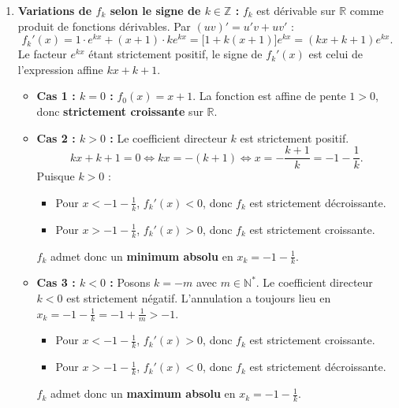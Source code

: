 \documentclass[11pt,a4paper]{article}
\newcommand{\N}{\mathbb{N}}
\newcommand{\Z}{\mathbb{Z}}
\newcommand{\R}{\mathbb{R}}
\begin{document}
\begin{correctionbox}[Exercice 8]
\begin{enumerate}[label=\textbf{\arabic*.}]
    \item \textbf{Variations de $f_k$ selon le signe de $k \in \Z$ :}
    $f_k$ est dérivable sur $\R$ comme produit de fonctions dérivables. Par $(uv)' = u'v + uv'$ :
    \[
    f_k'(x) = 1 \cdot e^{kx} + (x+1) \cdot k e^{kx} = \bigl[1 + k(x+1)\bigr]e^{kx} = (kx + k + 1)e^{kx}.
    \]
    Le facteur $e^{kx}$ étant strictement positif, le signe de $f_k'(x)$ est celui de l'expression affine $kx + k + 1$.
    \begin{itemize}
        \item \textbf{Cas 1 : $k = 0$ :}
        $f_0(x) = x + 1$. La fonction est affine de pente $1 > 0$, donc \textbf{strictement croissante} sur $\R$.
        \item \textbf{Cas 2 : $k > 0$ :}
        Le coefficient directeur $k$ est strictement positif.
        \[
        kx + k + 1 = 0 \iff kx = -(k+1) \iff x = -\frac{k+1}{k} = -1 - \frac{1}{k}.
        \]
        Puisque $k > 0$ :
        \begin{itemize}
            \item Pour $x < -1 - \frac{1}{k}$, $f_k'(x) < 0$, donc $f_k$ est strictement décroissante.
            \item Pour $x > -1 - \frac{1}{k}$, $f_k'(x) > 0$, donc $f_k$ est strictement croissante.
        \end{itemize}
        $f_k$ admet donc un \textbf{minimum absolu} en $x_k = -1 - \frac{1}{k}$.
        \item \textbf{Cas 3 : $k < 0$ :}
        Posons $k = -m$ avec $m \in \N^*$. Le coefficient directeur $k < 0$ est strictement négatif.
        L'annulation a toujours lieu en $x_k = -1 - \frac{1}{k} = -1 + \frac{1}{m} > -1$.
        \begin{itemize}
            \item Pour $x < -1 - \frac{1}{k}$, $f_k'(x) > 0$, donc $f_k$ est strictement croissante.
            \item Pour $x > -1 - \frac{1}{k}$, $f_k'(x) < 0$, donc $f_k$ est strictement décroissante.
        \end{itemize}
        $f_k$ admet donc un \textbf{maximum absolu} en $x_k = -1 - \frac{1}{k}$.
    \end{itemize}


\end{enumerate}
\end{correctionbox}
\end{document}
